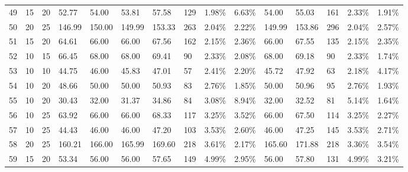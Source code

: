 \documentclass[
  a4paper,
,tablecaptionabove
]{scrartcl}
\numberwithin{equation}{section}
\begin{document}
\begin{longtable}{l|ll|ll|lllll|lllll}
  49 & 15                         & 20                         & 52.77                     & 54.00       & 53.81         & 57.58  & 129 & 1.98\%  & 6.63\% & 54.00  & 55.03  & 161 & 2.33\%  & 1.91\%  \\
  50 & 20                         & 25                         & 146.99                    & 150.00      & 149.99        & 153.33 & 263 & 2.04\%  & 2.22\% & 149.99 & 153.86 & 296 & 2.04\%  & 2.57\%  \\
  51 & 15                         & 20                         & 64.61                     & 66.00       & 66.00         & 67.56  & 162 & 2.15\%  & 2.36\% & 66.00  & 67.55  & 135 & 2.15\%  & 2.35\%  \\
  52 & 10                         & 15                         & 66.45                     & 68.00       & 68.00         & 69.41  & 90  & 2.33\%  & 2.08\% & 68.00  & 69.18  & 90  & 2.33\%  & 1.74\%  \\
  53 & 10                         & 10                         & 44.75                     & 46.00       & 45.83         & 47.01  & 57  & 2.41\%  & 2.20\% & 45.72  & 47.92  & 63  & 2.18\%  & 4.17\%  \\
  54 & 10                         & 20                         & 48.66                     & 50.00       & 50.00         & 50.93  & 83  & 2.76\%  & 1.85\% & 50.00  & 50.96  & 95  & 2.76\%  & 1.93\%  \\
  55 & 10                         & 20                         & 30.43                     & 32.00       & 31.37         & 34.86  & 84  & 3.08\%  & 8.94\% & 32.00  & 32.52  & 81  & 5.14\%  & 1.64\%  \\
  56 & 10                         & 25                         & 63.92                     & 66.00       & 66.00         & 68.33  & 117 & 3.25\%  & 3.52\% & 66.00  & 67.50  & 114 & 3.25\%  & 2.27\%  \\
  57 & 10                         & 25                         & 44.43                     & 46.00       & 46.00         & 47.20  & 103 & 3.53\%  & 2.60\% & 46.00  & 47.25  & 145 & 3.53\%  & 2.71\%  \\
  58 & 20                         & 25                         & 160.21                    & 166.00      & 165.99        & 169.60 & 218 & 3.61\%  & 2.17\% & 165.60 & 171.88 & 218 & 3.36\%  & 3.54\%  \\
  59 & 15                         & 20                         & 53.34                     & 56.00       & 56.00         & 57.65  & 149 & 4.99\%  & 2.95\% & 56.00  & 57.80  & 131 & 4.99\%  & 3.21\%  \\
  \bottomrule
\end{longtable}
\end{document}
